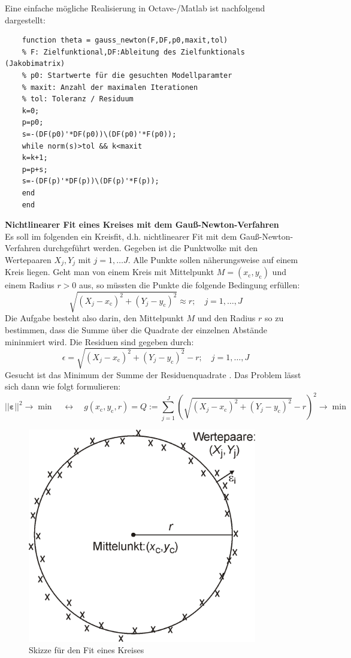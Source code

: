 Eine einfache mögliche Realisierung in Octave-/Matlab ist nachfolgend dargestellt:
\begin{verbatim}
	function theta = gauss_newton(F,DF,p0,maxit,tol)
	% F: Zielfunktional,DF:Ableitung des Zielfunktionals (Jakobimatrix)
	% p0: Startwerte für die gesuchten Modellparamter
	% maxit: Anzahl der maximalen Iterationen
	% tol: Toleranz / Residuum
	k=0;
	p=p0;
	s=-(DF(p0)'*DF(p0))\(DF(p0)'*F(p0));
	while norm(s)>tol && k<maxit
	k=k+1;
	p=p+s;
	s=-(DF(p)'*DF(p))\(DF(p)'*F(p));
	end
	end
\end{verbatim}
\textbf{Nichtlinearer Fit eines Kreises mit dem Gauß-Newton-Verfahren} \\
Es soll im folgenden ein Kreisfit, d.h. nichtlinearer Fit mit dem Gauß-Newton-Verfahren durchgeführt werden.
Gegeben ist die Punktwolke mit den Wertepaaren $X_j,Y_j$ mit $j =1,\ldots J$.
Alle Punkte sollen näherungsweise auf einem Kreis liegen.
Geht man von einem Kreis mit Mittelpunkt $M=(x_\mathrm{c},y_\mathrm{c})$ und einem Radius
$r>0$ aus, so müssten die Punkte die folgende Bedingung erfüllen:
\begin{equation}
	\sqrt{(X_j-x_\mathrm{c})^2+(Y_j-y_\mathrm{c})^2} \approx r; \quad j=1,\ldots,J
	\label{eq:Bedingung}
\end{equation}
Die Aufgabe besteht also darin, den Mittelpunkt $M$ und den Radius $r$
so zu bestimmen, dass die Summe über die Quadrate der einzelnen Abstände
mininmiert wird. Die Residuen sind gegeben durch:
\begin{equation}
	\epsilon = \sqrt{(X_j-x_\mathrm{c})^2+(Y_j-y_\mathrm{c})^2} - r ; \quad j=1,\ldots,J
\end{equation}
Gesucht ist das Minimum der Summe der Residuenquadrate . Das Problem lässt sich
dann wie folgt formulieren:
\begin{equation}
	||\boldsymbol \varepsilon||^2 \rightarrow \min  \quad \leftrightarrow \quad
	g(x_\mathrm{c},y_\mathrm{c},r) = Q := \sum_{j=1}^{J} \left( \sqrt{(X_j-x_\mathrm{c})^2+(Y_j-y_\mathrm{c})^2}-r\right)^2
	\rightarrow \min
\end{equation}
\begin{figure}[!htp]
	\begin{center}
		\includegraphics[width=100mm]{03_vorlesung/media/KreisfitSkizze.png}
		\caption{Skizze für den Fit eines Kreises}
		\label{fig:KreisfitSkizze}
	\end{center}
\end{figure}
